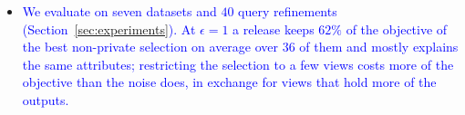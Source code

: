 \begin{itemize}[leftmargin=*]
\item \textcolor{blue}{We evaluate \sys{} on seven datasets and $40$ query refinements (Section~\ref{sec:experiments}). At $\epsilon=1$ a release keeps $62\%$ of the objective of the best non-private selection on average over $36$ of them and mostly explains the same attributes; restricting the selection to a few views costs more of the objective than the noise does, in exchange for views that hold more of the outputs.}
\end{itemize}
